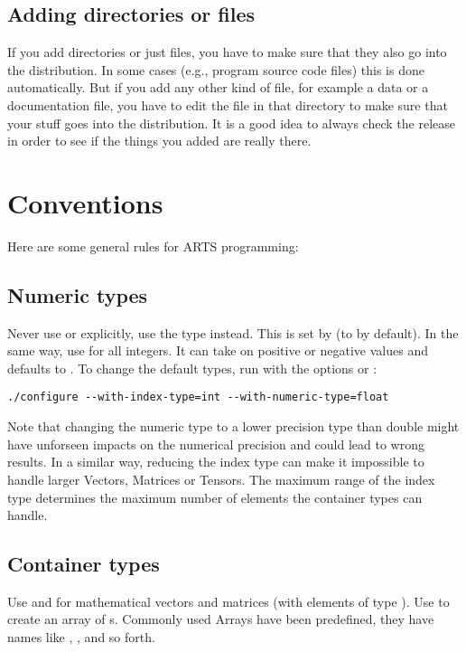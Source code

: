 \subsection{Adding directories or files}

If you add directories or just files, you have to make sure that they
also go into the distribution. In some cases (e.g., program source
code files) this is done automatically. But if you add any other kind
of file, for example a data or a documentation file, you have to edit
the  file in that directory to make sure that your
stuff goes into the distribution. It is a good idea to always check
the release in order to see if the things you added are really there.

\section{Conventions}
\label{sec:development:conv}

Here are some general rules for ARTS programming:

\subsection{Numeric types} Never use  or
 explicitly, use the type  instead.
This is set by  (to  by default).
In the same way, use  for all integers. It can take on
positive or negative values and defaults to .
To change the default types, run  with the options
 or :

{\small
\begin{verbatim}
./configure --with-index-type=int --with-numeric-type=float
\end{verbatim}
}

Note that changing the numeric type to a lower precision type than
double might have unforseen impacts on the numerical precision and could
lead to wrong results. In a similar way, reducing the index type can
make it impossible to handle larger Vectors, Matrices or Tensors. The
maximum range of the index type determines the maximum number of
elements the container types can handle.

\subsection{Container types} Use  and
 for mathematical vectors and matrices (with elements
of type ). Use  to
create an array of s.
Commonly used Arrays have been predefined, they have names like
, , and so forth.

